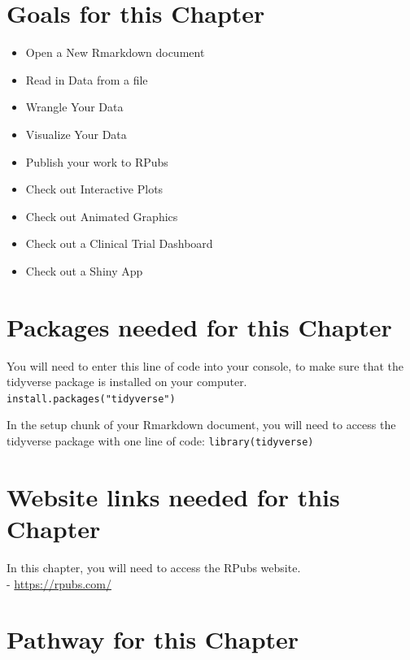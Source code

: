 \documentclass[
]{book}
\providecommand{\tightlist}{%
  \setlength{\itemsep}{0pt}\setlength{\parskip}{0pt}}
\begin{document}
\hypertarget{goals-for-this-chapter-1}{%
\section{Goals for this Chapter}\label{goals-for-this-chapter-1}}

\begin{itemize}
\tightlist
\item
  Open a New Rmarkdown document
\item
  Read in Data from a file
\item
  Wrangle Your Data
\item
  Visualize Your Data
\item
  Publish your work to RPubs
\item
  Check out Interactive Plots
\item
  Check out Animated Graphics
\item
  Check out a Clinical Trial Dashboard
\item
  Check out a Shiny App
\end{itemize}

\hypertarget{packages-needed-for-this-chapter}{%
\section{Packages needed for this Chapter}\label{packages-needed-for-this-chapter}}

You will need to enter this line of code into your console, to make sure that the tidyverse package is installed on your computer.
\texttt{install.packages("tidyverse")}

In the setup chunk of your Rmarkdown document, you will need to access the tidyverse package with one line of code:
\texttt{library(tidyverse)}

\hypertarget{website-links-needed-for-this-chapter-1}{%
\section{Website links needed for this Chapter}\label{website-links-needed-for-this-chapter-1}}

In this chapter, you will need to access the RPubs website.\\
- \url{https://rpubs.com/}

\hypertarget{pathway-for-this-chapter-1}{%
\section{Pathway for this Chapter}\label{pathway-for-this-chapter-1}}
\end{document}
